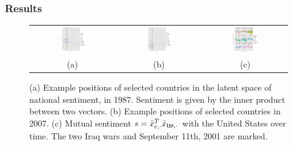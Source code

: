 \subsubsection{Results}
 \begin{figure}
  \begin{tabular}{ccc}
    \includegraphics[width=0.33\textwidth]{chapter_foreign_relations/figures/002_countries_by_ip_1987.pdf} &
    \includegraphics[width=0.33\textwidth]{chapter_foreign_relations/figures/002_countries_by_ip_2007.pdf} &
    \includegraphics[width=0.33\textwidth]{chapter_foreign_relations/figures/002_us_vs_everyone.pdf} \\
    (a) & (b) & (c) \\
  \end{tabular}
  \caption{
    (a) Example positions of selected countries in the latent space of national sentiment, in 1987. Sentiment is given by the inner product between two vectors.
    (b) Example positions of selected countries in 2007.
    (c) Mutual sentiment $s = \bar x_{c, \cdot}^T \bar x_{\mbox{\small us}, \cdot}$ with the United States over time. The two Iraq wars and September 11th, 2001 are marked.
  }
  \label{figure:figures}
\end{figure}

